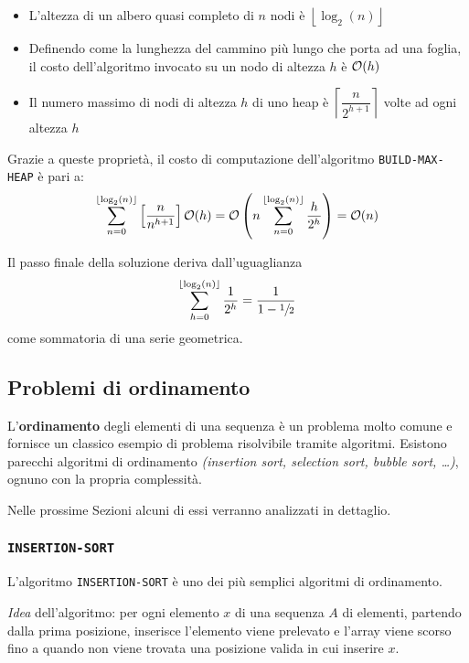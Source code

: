 \documentclass[italian, 10pt]{article}
\begin{document}
\begin{itemize}
  \item L'altezza di un albero quasi completo di \(n\) nodi è \(\left\lfloor \log_2(n) \right\rfloor\)
  \item Definendo come  la lunghezza del cammino più lungo che porta ad una foglia, il costo dell'algoritmo invocato su un nodo di altezza \(h\) è \(\mathcal{O}(h)\)
  \item Il numero massimo di nodi di altezza \(h\) di uno heap è \(\left\lceil \dfrac{n}{2^{h+1}} \right\rceil\) volte ad ogni altezza \(h\)
\end{itemize}

Grazie a queste proprietà, il costo di computazione dell'algoritmo \texttt{BUILD-MAX-HEAP} è pari a:
\[ \displaystyle \sum_{n=0}^{\left\lfloor \log_2(n) \right\rfloor} \left[ \dfrac{n}{n^{h+1}} \right] \mathcal{O}(h) = \mathcal{O} \left(n \displaystyle \sum_{n=0}^{\left\lfloor \log_2(n) \right\rfloor} \dfrac{h}{2^h} \right) = \mathcal{O} (n)\]

Il passo finale della soluzione deriva dall'uguaglianza
\[ \sum_{h=0}^{\left\lfloor \log_2(n) \right\rfloor} \dfrac{1}{2^h} = \dfrac{1}{1 - \sfrac{1}{2}} \]
come sommatoria di una serie geometrica.

\subsection{Problemi di ordinamento}

L'\textbf{ordinamento} degli elementi di una sequenza è un problema molto comune e fornisce un classico esempio di problema risolvibile tramite algoritmi.
Esistono parecchi algoritmi di ordinamento \textit{(insertion sort, selection sort, bubble sort, \ldots)}, ognuno con la propria complessità.

\bigskip
Nelle prossime Sezioni alcuni di essi verranno analizzati in dettaglio.

\subsubsection{\texttt{INSERTION-SORT}}

L'algoritmo \texttt{INSERTION-SORT} è uno dei più semplici algoritmi di ordinamento.

\textit{Idea} dell'algoritmo:
per ogni elemento \(x\) di una sequenza \(A\) di elementi, partendo dalla prima posizione, inserisce l'elemento viene prelevato e l'array viene scorso fino a quando non viene trovata una posizione valida in cui inserire \(x\).
\end{document}
